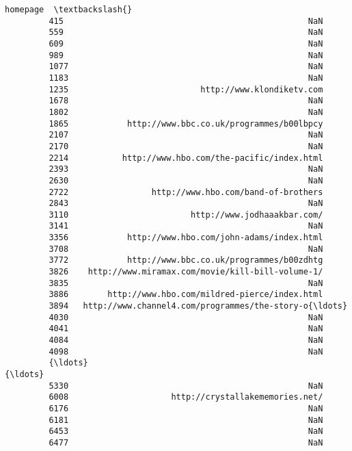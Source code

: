 \documentclass[11pt]{article}
\begin{document}
\begin{Verbatim}[commandchars=\\\{\}]
                                                         homepage  \textbackslash{}
         415                                                  NaN   
         559                                                  NaN   
         609                                                  NaN   
         989                                                  NaN   
         1077                                                 NaN   
         1183                                                 NaN   
         1235                           http://www.klondiketv.com   
         1678                                                 NaN   
         1802                                                 NaN   
         1865            http://www.bbc.co.uk/programmes/b00lbpcy   
         2107                                                 NaN   
         2170                                                 NaN   
         2214           http://www.hbo.com/the-pacific/index.html   
         2393                                                 NaN   
         2630                                                 NaN   
         2722                 http://www.hbo.com/band-of-brothers   
         2843                                                 NaN   
         3110                         http://www.jodhaaakbar.com/   
         3141                                                 NaN   
         3356            http://www.hbo.com/john-adams/index.html   
         3708                                                 NaN   
         3772            http://www.bbc.co.uk/programmes/b00zdhtg   
         3826    http://www.miramax.com/movie/kill-bill-volume-1/   
         3835                                                 NaN   
         3886        http://www.hbo.com/mildred-pierce/index.html   
         3894   http://www.channel4.com/programmes/the-story-o{\ldots}   
         4030                                                 NaN   
         4041                                                 NaN   
         4084                                                 NaN   
         4098                                                 NaN   
         {\ldots}                                                  {\ldots}   
         5330                                                 NaN   
         6008                     http://crystallakememories.net/   
         6176                                                 NaN   
         6181                                                 NaN   
         6453                                                 NaN   
         6477                                                 NaN   

\end{Verbatim}
\end{document}
